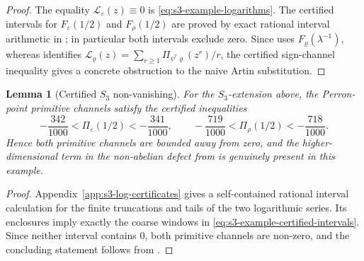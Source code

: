 \documentclass[11pt,a4paper]{amsart}
\theoremstyle{plain}
\newtheorem{lemma}[theorem]{Lemma}
\theoremstyle{definition}
\theoremstyle{remark}
\begin{document}
\begin{proof}
  The equality \(\mathcal L_\varepsilon(z)\equiv0\) is
  \eqref{eq:s3-example-logarithms}. The certified intervals for
  \(F_\varepsilon(1/2)\) and \(F_\rho(1/2)\) are proved by exact rational
  interval arithmetic in ; in
  particular both intervals exclude zero. Since
   uses
  \(F_\varrho(\lambda^{-1})\), whereas
   identifies
  \(\mathcal L_\varrho(z)=\sum_{r\ge1}\Pi_{\psi^r\varrho}(z^r)/r\), the
  certified sign-channel inequality gives a concrete obstruction to the
  naive Artin substitution.
\end{proof}

\begin{lemma}[Certified \(S_3\) non-vanishing]
  \label{lem:s3-example-perron-certificates}
  For the \(S_3\)-extension above, the Perron-point primitive channels
  satisfy the certified inequalities
  \begin{equation}\label{eq:s3-example-certified-intervals}
    -\frac{342}{1000}
    <\Pi_\varepsilon(1/2)<-\frac{341}{1000},
    \qquad
    -\frac{719}{1000}
    <\Pi_\rho(1/2)<-\frac{718}{1000}.
  \end{equation}
  Hence both primitive channels are bounded away from zero, and the
  higher-dimensional term in the non-abelian defect from
   is genuinely present in this
  example.
\end{lemma}

\begin{proof}
  Appendix~\ref{app:s3-log-certificates} gives a self-contained
  rational interval calculation for the finite truncations and tails of
  the two logarithmic series. Its enclosures imply exactly the coarse
  windows in \eqref{eq:s3-example-certified-intervals}. Since neither
  interval contains \(0\), both primitive channels are non-zero, and the
  concluding statement follows from
  .
\end{proof}
\end{document}
